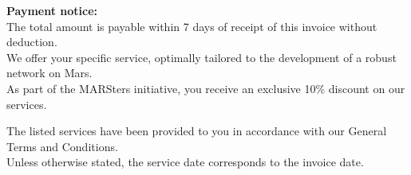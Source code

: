 \documentclass[12pt,a4paper]{article}
\begin{document}
\renewcommand{\arraystretch}{1.4}




\vspace{3.5em}
\fbox{%
  \noindent
  \begin{minipage}[t]{0.48\textwidth}
  \renewcommand{\arraystretch}{1.3}
  \begingroup
    \rowcolors{2}{}{} %
  \begin{tabularx}{\linewidth}{@{}X r@{}}
  
  \end{tabularx}
  \endgroup
  \end{minipage}
}
\vfill

\begin{minipage}[t]{\textwidth}
\small
\textbf{Payment notice:} \\
The total amount is payable within 7 days of receipt of this invoice without deduction.\\
We offer your specific service, optimally tailored to the development of a robust network on Mars.\\
As part of the MARSters initiative, you receive an exclusive 10\% discount on our services.
\end{minipage}

\vspace{1.5em}

\begin{flushleft}
\footnotesize
The listed services have been provided to you in accordance with our General Terms and Conditions.\\
Unless otherwise stated, the service date corresponds to the invoice date.
\end{flushleft}
\end{document}
